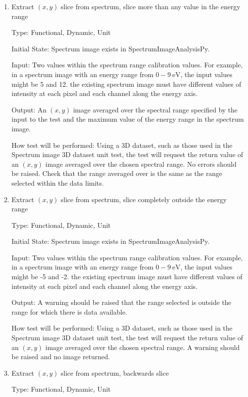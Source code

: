 \documentclass[12pt, titlepage]{article}
\newcommand{\progname}{SpectrumImageAnalysisPy}
\begin{document}
\begin{enumerate}
\item{Extract $(x,y)$ slice from spectrum, slice more than any value in the
energy range}

Type: Functional, Dynamic, Unit

Initial State: Spectrum image exists in \progname{}.

Input: Two values within the spectrum range calibration values. For example, in
a spectrum image with an energy range from $0-9\ \si{\electronvolt}$, the input
values might be 5 and 12. the existing spectrum image must have different values
of intensity at each pixel and each channel along the energy axis.

Output: An $(x,y)$ image averaged over the spectral range specified by the input
to the test and the maximum value of the energy range in the spectrum image.

How test will be performed: Using a 3D dataset, such as those used in the
Spectrum image 3D dataset unit test, the test will request the return value of
an $(x,y)$ image averaged over the chosen spectral range. No errors should be
raised. Check that the range averaged over is the same as the range selected
within the data limits.


\item{Extract $(x,y)$ slice from spectrum, slice completely outside the energy
range}

Type: Functional, Dynamic, Unit

Initial State: Spectrum image exists in \progname{}.

Input: Two values within the spectrum range calibration values. For example, in
a spectrum image with an energy range from $0-9\ \si{\electronvolt}$, the input
values might be -5 and -2. the existing spectrum image must have different
values of intensity at each pixel and each channel along the energy axis.

Output: A warning should be raised that the range selected is outside the range
for which there is data available.

How test will be performed: Using a 3D dataset, such as those used in the
Spectrum image 3D dataset unit test, the test will request the return value of
an $(x,y)$ image averaged over the chosen spectral range. A warning should be
raised and no image returned.


\item{Extract $(x,y)$ slice from spectrum, backwards slice}

Type: Functional, Dynamic, Unit


\end{enumerate}
\end{document}
